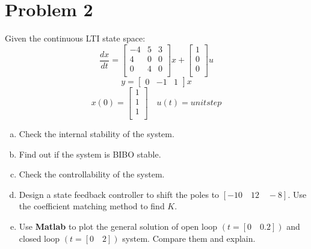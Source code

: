 \documentclass{article}
\begin{document}
\newpage

\section*{Problem 2}
Given the continuous LTI state space:
$$
\frac{dx}{dt} =
\begin{bmatrix}
-4 & 5 & 3  \\
4 & 0 & 0 \\
0 & 4 & 0 \\
\end{bmatrix}
x +
\begin{bmatrix}
1 \\
0 \\
0 \\
\end{bmatrix}
u
$$
$$
y = \begin{bmatrix} 0 & -1 & 1 \end{bmatrix}x
$$
$$
x(0) =
\begin{bmatrix}
1 \\
1 \\
1 \\
\end{bmatrix}
\quad
u(t) = unitstep
$$

\begin{enumerate}[a.]
\item Check the internal stability of the system.
\newline

\item Find out if the system is BIBO stable.
\newline

\item Check the controllability of the system.
\newline

\item Design a state feedback controller to shift the poles to $[-10 \quad 12 \quad -8]$. Use the coefficient matching method to find $K$.
\newline

\item Use \textbf{Matlab} to plot the general solution of open loop $(t = [0 \quad 0.2])$ and closed loop $(t = [0 \quad 2])$ system. Compare them and explain.
\newline

\end{enumerate}

\newpage
\end{document}
